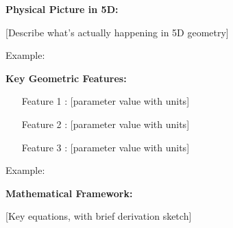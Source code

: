 


\begin{mdframed}[frametitle={\colorbox{white}{\textbf{5D Mechanism: [Title]}}},
                 linewidth=2pt,
                 linecolor=blue!75!black,
                 backgroundcolor=blue!5]

\textbf{Physical Picture in 5D:}

[Describe what's actually happening in 5D geometry]

Example:

\textbf{Key Geometric Features:}
\begin{itemize}
\item [Feature 1]: [parameter value with units]
\item [Feature 2]: [parameter value with units]
\item [Feature 3]: [parameter value with units]
\end{itemize}

Example:

\textbf{Mathematical Framework:}

[Key equations, with brief derivation sketch]

\begin{equation}
[\text{Key equation 1}]
\end{equation}

\begin{equation}
[\text{Key equation 2 if needed}]
\end{equation}


\end{mdframed}
